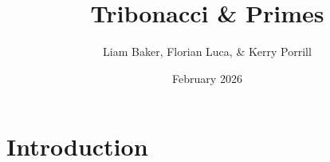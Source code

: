 \documentclass{article}
\title{Tribonacci \& Primes}
\author{Liam Baker, Florian Luca, \& Kerry Porrill}
\date{February 2026}
\begin{document}
\maketitle

\section{Introduction}
\end{document}
